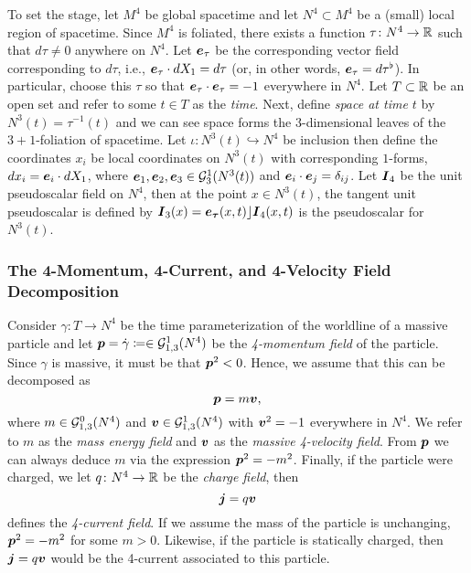 \documentclass[conf]{new-aiaa}
\begin{document}
To set the stage, let $M^4$ be global spacetime and let $N^4\subset M^4$ be a (small) local region of spacetime. Since $M^4$ is foliated, there exists a function $\tau \colon N^4 \to \mathbb{R}$ such that $d\tau \neq 0$ anywhere on $N^4$. Let $\boldsymbol{e}_\tau$ be the corresponding vector field corresponding to $d\tau$, i.e., $\boldsymbol{e}_\tau \cdot dX_1 = d\tau$ (or, in other words, $\boldsymbol{e}_\tau = d\tau^\flat$).  In particular, choose this $\tau$ so that $\boldsymbol{e}_\tau\cdot \boldsymbol{e}_\tau = -1$ everywhere in $N^4$. Let $T \subset \mathbb{R}$ be an open set and refer to some $t\in T$ as the \emph{time}. Next, define \emph{space at time $t$} by $N^3(t)=\tau^{-1}(t)$ and we can see space forms the $3$-dimensional leaves of the $3+1$-foliation of spacetime. Let $\iota\colon N^3(t)\hookrightarrow N^4$ be inclusion then define the coordinates $x_{i}$ be local coordinates on $N^3(t)$ with corresponding $1$-forms, $dx_i = \boldsymbol{e}_i \cdot dX_1$, where $\boldsymbol{e}_1,\boldsymbol{e}_2,\boldsymbol{e}_3\in \mathcal{G}_{3}^1(N^3(t))$ and $\boldsymbol{e}_i\cdot \boldsymbol{e}_j = \delta_{ij}$. Let $\boldsymbol{I}_4$ be the unit pseudoscalar field on $N^4$, then at the point $x \in N^3(t)$, the tangent unit pseudoscalar is defined by $\boldsymbol{I}_3(x) = \boldsymbol{e_\tau}(x,t)\rfloor \boldsymbol{I}_4(x,t)$ is the pseudoscalar for $N^3(t)$.

\subsubsection{The 4-Momentum, 4-Current, and 4-Velocity Field Decomposition}

Consider $\gamma \colon T \to N^4$ be the time parameterization of the worldline of a massive particle and let $\boldsymbol{p} = \dot{\gamma} \coloneqq \in \mathcal{G}_{1,3}^1(N^4)$ be the \emph{4-momentum field} of the particle. Since $\gamma$ is massive, it must be that $\boldsymbol{p}^2<0$. Hence, we assume that this can be decomposed as
\begin{equation}
    \boldsymbol{p} = m \boldsymbol{v},
\end{equation}
where $m\in \mathcal{G}_{1,3}^0(N^4)$ and $\boldsymbol{v} \in \mathcal{G}_{1,3}^1(N^4)$ with $\boldsymbol{v}^2=-1$ everywhere in $N^4$. We refer to $m$ as the \emph{mass energy field} and $\boldsymbol{v}$ as the \emph{massive 4-velocity field}. From $\boldsymbol{p}$ we can always deduce $m$ via the expression $\boldsymbol{p}^2 = -m^2$. Finally, if the particle were charged, we let $q\colon N^4 \to \mathbb{R}$ be the \emph{charge field}, then 
\begin{equation}
\boldsymbol{j}=q\boldsymbol{v}
\end{equation}
defines the \emph{4-current field}. If we assume the mass of the particle is unchanging, $\boldsymbol{p}^2=-m^2$ for some $m>0$. Likewise, if the particle is statically charged, then $\boldsymbol{j}=q\boldsymbol{v}$ would be the 4-current associated to this particle. 
\end{document}
